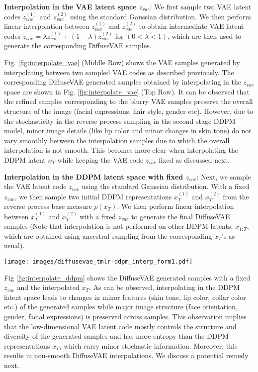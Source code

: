 \documentclass[10pt]{article} \usepackage[accepted]{tmlr}
\begin{document}
\textbf{Interpolation in the VAE latent space $z_{vae}$}: We first sample two VAE latent codes $z_{vae}^{(1)}$ and $z_{vae}^{(2)}$ using the standard Gaussian distribution. We then perform linear interpolation between $z_{vae}^{(1)}$ and $z_{vae}^{(2)}$ to obtain intermediate VAE latent codes $\tilde{z}_{vae} = \lambda z_{vae}^{(1)} + (1 - \lambda) z_{vae}^{(2)}$ for $(0<\lambda<1)$, which are then used to generate the corresponding DiffuseVAE samples.

Fig. \ref{fig:interpolate_vae} (Middle Row) shows the VAE samples generated by interpolating between two sampled VAE codes as described previously. The corresponding DiffuseVAE generated samples obtained by interpolating in the  $z_{vae}$ space are shown in Fig. \ref{fig:interpolate_vae} (Top Row). It can be observed that the refined samples corresponding to the blurry VAE samples preserve the overall structure of the image (facial expressions, hair style, gender etc). However, due to the stochasticity in the reverse process sampling in the second stage DDPM model, minor image details (like lip color and minor changes in skin tone) do not vary smoothly between the interpolation samples due to which the overall interpolation is not smooth. This becomes more clear when interpolating the DDPM latent $x_T$ while keeping the VAE code $z_{vae}$ fixed as discussed next.

\textbf{Interpolation in the DDPM latent space with fixed $z_{vae}$}: Next, we sample the VAE latent code $z_{vae}$ using the standard Gaussian distribution. With a fixed $z_{vae}$, we then sample two initial DDPM representations $x_T^{(1)}$ and $x_T^{(2)}$ from the reverse process base measure $p(x_T)$. We then perform linear interpolation between $x_T^{(1)}$ and $x_T^{(2)}$ with a fixed $z_{vae}$ to generate the final DiffuseVAE samples (Note that interpolation is not performed on other DDPM latents, $x_{1:T}$, which are obtained using ancestral sampling from the corresponding $x_T$'s as usual).

\begin{figure*}
  \centering
    \texttt{[image: images/diffusevae\_tmlr-ddpm\_interp\_form1.pdf]}
    \caption{DiffuseVAE samples generated by linearly interpolating in the $x_T$ latent space (Formulation-1, T=1000). $\lambda$ denotes the interpolation factor.}
    \label{fig:interpolate_ddpm}
\end{figure*}

Fig \ref{fig:interpolate_ddpm} shows the DiffuseVAE generated samples with a fixed $z_{vae}$ and the interpolated $x_T$. As can be observed, interpolating in the DDPM latent space leads to changes in minor features (skin tone, lip color, collar color etc.) of the generated samples while major image structure (face orientation, gender, facial expressions) is preserved across samples. This observation implies that the low-dimensional VAE latent code mostly controls the structure and diversity of the generated samples and has more entropy than the DDPM representations $x_T$, which carry minor stochastic information. Moreover, this results in non-smooth DiffuseVAE interpolations. We discuss a potential remedy next.
\end{document}
